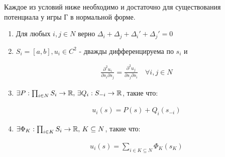     \begin{thm}
      \label{theorem:iff_for_potential}
      Каждое из условий ниже необходимо и достаточно для существования потенциала у игры Г в нормальной форме.

	\begin{enumerate}
		\item \label{theorem_equation:iff_potential_deltas} Для любых  $i, j \in N$ верно  $\Delta_i + \Delta_j + \Delta_i' + \Delta_j' = 0$

		\item \label{theorem_equation:iff_potential_partial} $S_i = [a, b], u_i \in C^2$ - дважды дифференцируема по $s_i$ и

			\begin{align*}
				\frac{\partial^2 u_i}{\partial s_i \partial s_j} = \frac{\partial^2 u_j}{\partial s_j \partial s_i} \quad \forall i, j \in N
			\end{align*}

		      \item \label{theorem_equation:iff_potential_P_Q}$\exists P: \prod_{i \in N}S_i \to \mathbb{R}, \, \exists Q_i: S_{-i} \to \mathbb{R}$, такие что:

			\begin{align*}
				u_i(s) = P(s) + Q_i(s_{-i})
			\end{align*}

		\item \label{theorem_equation:iff_potential_Phi} $\exists \Phi_K : \prod_{i \in K}S_i \to \mathbb{R}, \, K \subseteq N$, такие что: 

			 \begin{align*}
				 u_i(s) = \sum_{i \in K \subseteq N}\Phi_K(s_K)
			\end{align*}

	\end{enumerate}
\end{thm}

